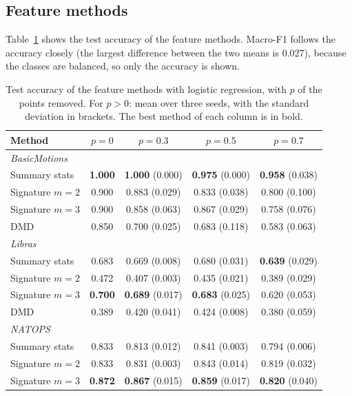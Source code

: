 \subsection{Feature methods}

Table~\ref{tab:features} shows the test accuracy of the feature methods.
Macro-F1 follows the accuracy closely (the largest difference between
the two means is 0.027), because the classes are balanced, so only the
accuracy is shown.

\begin{table}[ht]
\centering
\small
\caption{Test accuracy of the feature methods with logistic regression,
with $p$ of the points removed. For $p > 0$: mean over three seeds, with
the standard deviation in brackets. The best method of each column is in
bold.}
\label{tab:features}
\begin{tabular}{lcccc}
\toprule
Method & $p = 0$ & $p = 0.3$ & $p = 0.5$ & $p = 0.7$ \\
\midrule
\multicolumn{5}{l}{\emph{BasicMotions}} \\
Summary stats & \textbf{1.000} & \textbf{1.000} (0.000) & \textbf{0.975} (0.000) & \textbf{0.958} (0.038) \\
Signature $m=2$ & 0.900 & 0.883 (0.029) & 0.833 (0.038) & 0.800 (0.100) \\
Signature $m=3$ & 0.900 & 0.858 (0.063) & 0.867 (0.029) & 0.758 (0.076) \\
DMD & 0.850 & 0.700 (0.025) & 0.683 (0.118) & 0.583 (0.063) \\
\midrule
\multicolumn{5}{l}{\emph{Libras}} \\
Summary stats & 0.683 & 0.669 (0.008) & 0.680 (0.031) & \textbf{0.639} (0.029) \\
Signature $m=2$ & 0.472 & 0.407 (0.003) & 0.435 (0.021) & 0.389 (0.029) \\
Signature $m=3$ & \textbf{0.700} & \textbf{0.689} (0.017) & \textbf{0.683} (0.025) & 0.620 (0.053) \\
DMD & 0.389 & 0.420 (0.041) & 0.424 (0.008) & 0.380 (0.059) \\
\midrule
\multicolumn{5}{l}{\emph{NATOPS}} \\
Summary stats & 0.833 & 0.813 (0.012) & 0.841 (0.003) & 0.794 (0.006) \\
Signature $m=2$ & 0.833 & 0.831 (0.003) & 0.843 (0.014) & 0.819 (0.032) \\
Signature $m=3$ & \textbf{0.872} & \textbf{0.867} (0.015) & \textbf{0.859} (0.017) & \textbf{0.820} (0.040) \\

\end{tabular}
\end{table}
